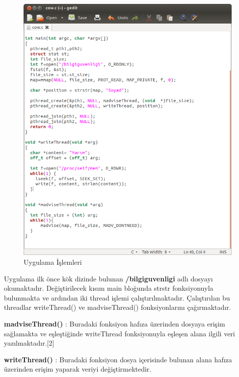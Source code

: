 \documentclass[conference, 12pt, a4paper]{IEEEtran}
\begin{document}
\begin{sloppypar}
    \begin{figure}[htbp]
        \centering
        \includegraphics[scale=0.30]{cow-code.png}
        \caption{Uygulama İşlemleri}
    \end{figure}

    Uygulama ilk önce kök dizinde bulunan \textbf{/bilgiguvenligi} adlı dosyayı okumaktadır. Değiştirilecek kısım main bloğunda strstr fonksiyonuyla bulunmakta ve ardından iki thread işlemi çalıştırılmaktadır. Çalıştırılan bu threadlar writeThread() ve madviseThread() fonksiyonlarını çağırmaktadır.

    \textbf{madviseThread()} : Buradaki fonksiyon hafıza üzerinden dosyaya erişim sağlamakta ve eşleştiğinde writeThread fonksiyonuyla eşleşen alana ilgili veri yazılmaktadır.[2]

    \textbf{writeThread()} :  Buradaki fonksiyon dosya içerisinde bulunan alana hafıza üzerinden erişim yaparak veriyi değiştirmektedir.


\end{sloppypar}
\end{document}
